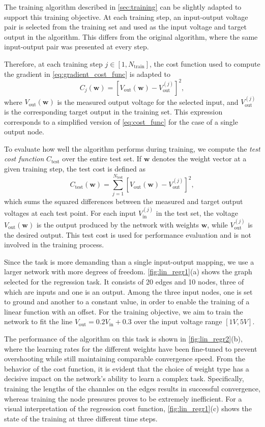 \documentclass[reprint,superscriptaddress,prb,showkeys]{revtex4-2}
\begin{document}
The training algorithm described in \cref{sec:training} can be slightly adapted to support this training objective. At each training step, an input-output voltage pair is selected from the training set and used as the input voltage and target output in the algorithm. This differs from the original algorithm, where the same input-output pair was presented at every step.

Therefore, at each training step $ j \in[1, N_{\text{train}}] $, the cost function used to compute the gradient in \cref{eq:gradient_cost_func} is adapted to
\[
C_j(\boldsymbol{w}) = \left[ V_{\text{out}}(\boldsymbol{w}) - V_{\text{out}}^{(j)} \right]^2,
\]
where $ V_{\text{out}}(\boldsymbol{w}) $ is the measured output voltage for the selected input, and $ V_{\text{out}}^{(j)} $ is the corresponding target output in the training set. This expression corresponds to a simplified version of \cref{eq:cost_func} for the case of a single output node.

To evaluate how well the algorithm performs during training, we compute the \emph{test cost function} $ C_{\text{test}} $ over the entire test set. If $ \boldsymbol{w} $ denotes the weight vector at a given training step, the test cost is defined as
\[
C_{\text{test}}\left( \boldsymbol{w} \right) = \sum_{j=1}^{N_{\text{test}}} \left[ V_{\text{out}}(\boldsymbol{w}) - V_{\text{out}}^{(j)} \right]^2,
\]
which sums the squared differences between the measured and target output voltages at each test point. For each input $V_{\text{in}}^{(j)}$ in the test set, the voltage $ V_{\text{out}}(\boldsymbol{w}) $ is the output produced by the network with weights $ \boldsymbol{w} $, while $ V_{\text{out}}^{(j)} $ is the desired output. This test cost is used for performance evaluation and is not involved in the training process.

Since the task is more demanding than a single input-output mapping, we use a larger network with more degrees of freedom. \cref{fig:lin_regr1}(a) shows the graph selected for the regression task. It consists of 20 edges and 10 nodes, three of which are inputs and one is an output. Among the three input nodes, one is set to ground and another to a constant value, in order to enable the training of a linear function with an offset. For the training objective, we aim to train the network to fit the line $V_{\text{out}} = 0.2 V_{\text{in}} + 0.3$ over the input voltage range $[1V, 5V]$.

The performance of the algorithm on this task is shown in \cref{fig:lin_regr2}(b), where the learning rates for the different weights have been fine-tuned to prevent overshooting while still maintaining comparable convergence speed. From the behavior of the cost function, it is evident that the choice of weight type has a decisive impact on the network’s ability to learn a complex task. Specifically, training the lengths of the channles on the edges results in successful convergence, whereas training the node pressures proves to be extremely inefficient. For a visual interpretation of the regression cost function, \cref{fig:lin_regr1}(c) shows the state of the training at three different time steps.
\end{document}
